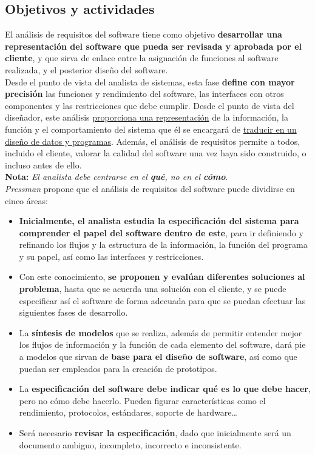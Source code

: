 \subsection{Objetivos y actividades}

El análisis de requisitos del software tiene como objetivo \textbf{desarrollar una representación del software que pueda ser revisada y aprobada por el cliente}, y que sirva de enlace entre la asignación de funciones al software realizada, y el posterior diseño del software.\\

Desde el punto de vista del analista de sistemas, esta fase \textbf{define con mayor precisión} las funciones y rendimiento del software, las interfaces con otros componentes y las restricciones que debe cumplir. Desde el punto de vista del diseñador, este análisis \uline{proporciona una representación} de la información, la función y el comportamiento del sistema que él se encargará de \uline{traducir en un diseño de datos y programas}. Además, el análisis de requisitos permite a todos, incluido el cliente, valorar la calidad del software una vez haya sido construido, o incluso antes de ello.\\

\textbf{Nota:} \textit{El analista debe centrarse en el \textbf{qué}, no en el \textbf{cómo}}.\\

\textit{Pressman} propone que el análisis de requisitos del software puede dividirse en cinco áreas:

\begin{itemize}
    \item \textbf{Inicialmente, el analista estudia la especificación del sistema para comprender el papel del software dentro de este}, para ir definiendo y refinando los flujos y la estructura de la información, la función del programa y su papel, así como las interfaces y restricciones.
    \item Con este conocimiento, \textbf{se proponen y evalúan diferentes soluciones al problema}, hasta que se acuerda una solución con el cliente, y se puede especificar así el software de forma adecuada para que se puedan efectuar las siguientes fases de desarrollo.
    \item La \textbf{síntesis de modelos} que se realiza, además de permitir entender mejor los flujos de información y la función de cada elemento del software, dará pie a modelos que sirvan de \textbf{base para el diseño de software}, así como que puedan ser empleados para la creación de prototipos.
    \item La \textbf{especificación del software debe indicar qué es lo que debe hacer}, pero no cómo debe hacerlo. Pueden figurar características como el rendimiento, protocolos, estándares, soporte de hardware\ldots
    \item Será necesario \textbf{revisar la especificación}, dado que inicialmente será un documento ambiguo, incompleto, incorrecto e inconsistente.
\end{itemize}


